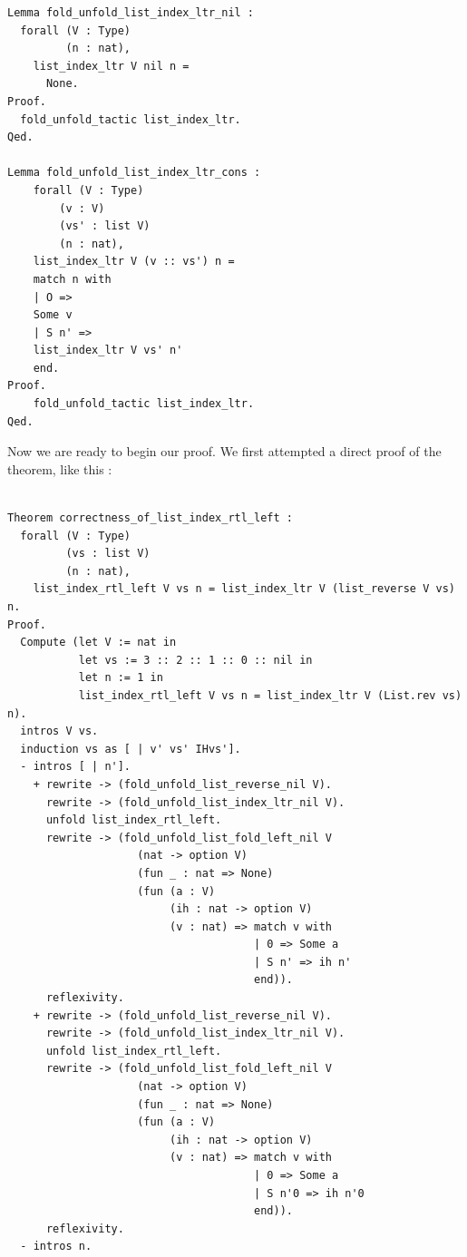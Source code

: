 \documentclass{article}
\begin{document}
\begin{lstlisting}
Lemma fold_unfold_list_index_ltr_nil :
  forall (V : Type)
         (n : nat),
    list_index_ltr V nil n =
      None.
Proof.
  fold_unfold_tactic list_index_ltr.
Qed.

Lemma fold_unfold_list_index_ltr_cons :
    forall (V : Type)
        (v : V)
        (vs' : list V)
        (n : nat),
    list_index_ltr V (v :: vs') n =
    match n with
    | O =>
    Some v
    | S n' =>
    list_index_ltr V vs' n'
    end.
Proof.
    fold_unfold_tactic list_index_ltr.
Qed.
\end{lstlisting}

Now we are ready to begin our proof. We first attempted a direct proof of the theorem, like this :

\begin{lstlisting}
           
Theorem correctness_of_list_index_rtl_left :
  forall (V : Type)
         (vs : list V)
         (n : nat),
    list_index_rtl_left V vs n = list_index_ltr V (list_reverse V vs) n.
Proof.
  Compute (let V := nat in
           let vs := 3 :: 2 :: 1 :: 0 :: nil in
           let n := 1 in
           list_index_rtl_left V vs n = list_index_ltr V (List.rev vs) n).
  intros V vs.
  induction vs as [ | v' vs' IHvs'].
  - intros [ | n'].
    + rewrite -> (fold_unfold_list_reverse_nil V).
      rewrite -> (fold_unfold_list_index_ltr_nil V).
      unfold list_index_rtl_left.
      rewrite -> (fold_unfold_list_fold_left_nil V
                    (nat -> option V)
                    (fun _ : nat => None)
                    (fun (a : V)
                         (ih : nat -> option V)
                         (v : nat) => match v with
                                      | 0 => Some a
                                      | S n' => ih n'
                                      end)).
      reflexivity.
    + rewrite -> (fold_unfold_list_reverse_nil V).
      rewrite -> (fold_unfold_list_index_ltr_nil V). 
      unfold list_index_rtl_left.
      rewrite -> (fold_unfold_list_fold_left_nil V
                    (nat -> option V)
                    (fun _ : nat => None)
                    (fun (a : V)
                         (ih : nat -> option V)
                         (v : nat) => match v with
                                      | 0 => Some a
                                      | S n'0 => ih n'0
                                      end)).
      reflexivity.
  - intros n.
\end{lstlisting}
\end{document}
